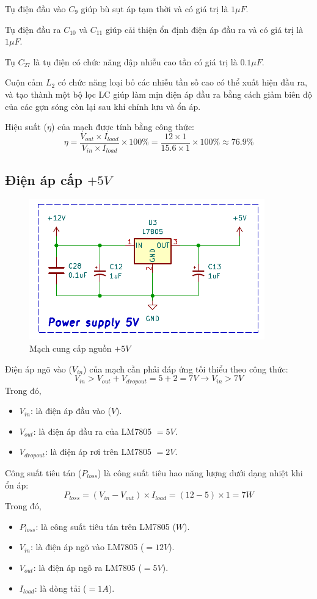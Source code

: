Tụ điện đầu vào $C_{9}$ giúp bù sụt áp tạm thời và có giá trị là $1\mu F$.

Tụ điện đầu ra $C_{10}$ và $C_{11}$ giúp cải thiện ổn định điện áp đầu ra và có giá trị là $1\mu F$.

Tụ $C_{27}$ là tụ điện có chức năng dập nhiễu cao tần có giá trị là $0.1\mu F$.

Cuộn cảm $L_{2}$ có chức năng loại bỏ các nhiễu tần số cao có thể xuất hiện đầu ra, và tạo thành một bộ lọc LC giúp làm mịn điện áp đầu ra bằng cách giảm biên độ của các gợn sóng còn lại sau khi chỉnh lưu và ổn áp.

Hiệu suất ($\eta$) của mạch được tính bằng công thức: \[ \eta = \dfrac{V_{out}\times I_{load}}{V_{in} \times I_{load}}\times 100\% = \dfrac{12\times 1}{15.6 \times 1}\times 100\% \approx 76.9\% \]

\subsection{Điện áp cấp $+5V$}

\begin{figure}[H]
	\centering
	\includegraphics[width=0.6\linewidth]{./picture/power_supply_5V.pdf}
	\caption{Mạch cung cấp nguồn $+5V$}
	\label{f_supply_+5V}
\end{figure}

Điện áp ngõ vào ($V_{in}$) của mạch cần phải đáp ứng tối thiểu theo công thức: \[ V_{in} > V_{out} + V_{dropout} = 5 + 2 = 7V \rightarrow V_{in} > 7V\]
Trong đó,
\begin{itemize}[label = -]
	\item $V_{in}$: là điện áp đầu vào ($V$).
	\item $V_{out}$: là điện áp đầu ra của LM7805 $=5V$.
	\item $V_{dropout}$: là điện áp rơi trên LM7805 $=2V$.
\end{itemize}

Công suất tiêu tán ($P_{loss}$) là công suất tiêu hao năng lượng dưới dạng nhiệt khi ổn áp: \[ P_{loss} = (V_{in} - V_{out}) \times I_{load} = (12 - 5)\times 1 = 7W\]
Trong đó,
\begin{itemize}[label=-]
	\item $P_{loss}$: là công suất tiêu tán trên LM7805 ($W$).
	\item $V_{in}$: là điện áp ngõ vào LM7805 ($=12V$).
	\item $V_{out}$: là điện áp ngõ ra LM7805 ($=5V$).
	\item $I_{load}$: là dòng tải ($=1A$).
\end{itemize}

